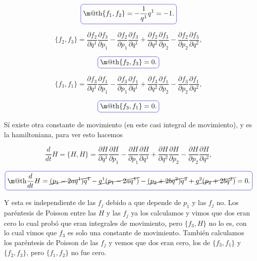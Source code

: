 \documentclass[a4paper,10pt]{article}
\makeatletter
\numberwithin{equation}{section}
\newcommand*{\boxcolor}{blue}
\renewcommand{\boxed}[1]{\textcolor{\boxcolor}{%
\tikz[baseline={([yshift=-1ex]current bounding box.center)}] \node [rectangle, minimum width=1ex,rounded corners,draw] {\normalcolor\m@th$\displaystyle#1$};}}
\makeatother
\begin{document}
\begin{equation}
 \boxed{ \{f_1,f_2\} = - \frac{1}{q^1}q^1 = -1. }
\end{equation}

\begin{equation}
 \{f_2,f_3\} = \frac{\partial f_2}{\partial q^1}\frac{\partial f_3}{\partial p_1} - 
 \frac{\partial f_2}{\partial p_1}\frac{\partial f_3}{\partial q^1} +  \frac{\partial f_2}{\partial q^2}\frac{\partial f_3}{\partial p_2} - 
 \frac{\partial f_2}{\partial p_2}\frac{\partial f_3}{\partial q^2},
\end{equation}

\begin{equation}
 \boxed{ \{f_2,f_3\} = 0 .}
\end{equation}

\begin{equation}
 \{f_3,f_1\} = \frac{\partial f_3}{\partial q^1}\frac{\partial f_1}{\partial p_1} - 
 \frac{\partial f_3}{\partial p_1}\frac{\partial f_1}{\partial q^1} +  \frac{\partial f_3}{\partial q^2}\frac{\partial f_1}{\partial p_2} - 
 \frac{\partial f_3}{\partial p_2}\frac{\partial f_1}{\partial q^2},
\end{equation}

\begin{equation}
 \boxed{ \{f_3,f_1\} = 0 .}
\end{equation}


Sí existe otra constante de movimiento (en este casi integral de movimiento),
y es la hamiltoniana, para ver esto hacemos 

\begin{equation}
 \frac{d}{dt} H = \{H,H\} = \frac{\partial H}{\partial q^1}\frac{\partial H}{\partial p_1} - 
 \frac{\partial H}{\partial p_1}\frac{\partial H}{\partial q^1} +  \frac{\partial H}{\partial q^2}\frac{\partial H}{\partial p_2} - 
 \frac{\partial H}{\partial p_2}\frac{\partial H}{\partial q^2},
\end{equation}

\begin{equation}
  \boxed{\frac{d}{dt} H = \cancel{(p_1 - 2aq^1)q^1} - \cancel{q^1(p_1 - 2aq^1)} - \cancel{(p_2 + 2bq^2)q^2} + 
  \cancel{q^2(p_2 + 2bq^2)} = 0.}
\end{equation}

Y esta es independiente de las $f_j$ debido a que depende de $p_1$ y las $f_j$ no. Los 
paréntesis de Poisson entre las $H$ y las $f_j$ ya los calculamos y vimos que dos eran cero 
lo cual probó que eran integrales de movimiento, pero $\{f_3,H\}$ no lo es, con lo cual 
vimos que $f_3$ es solo una constante de movimiento. También calculamos los paréntesis de 
Poisson de las $f_j$ y vemos que dos eran cero, los de $\{f_3,f_1\}$ y $\{f_2,f_3\}$, pero 
$\{f_1,f_2\}$ no fue cero.
\end{document}
